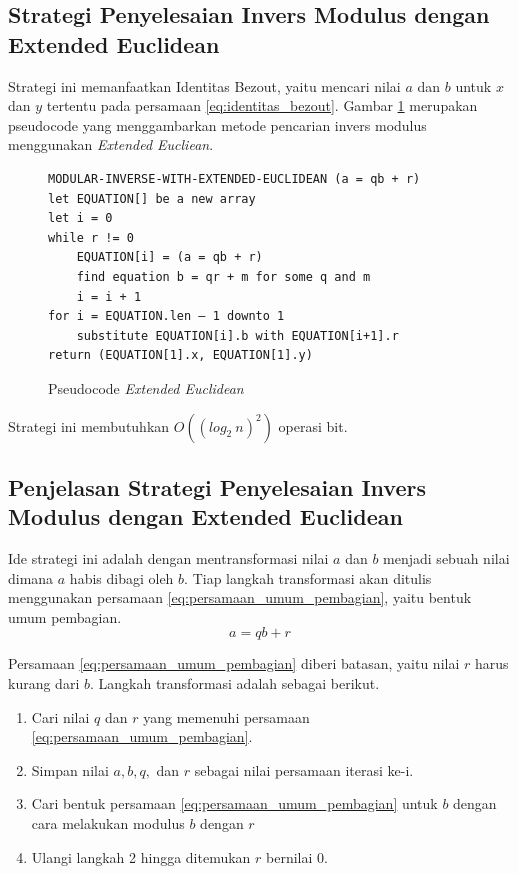 \subsection {Strategi Penyelesaian Invers Modulus dengan Extended Euclidean}

Strategi ini memanfaatkan Identitas Bezout, yaitu mencari nilai $ a $ dan $ b $ untuk $ x $ dan $ y $ tertentu pada persamaan \eqref{eq:identitas_bezout}. Gambar \ref{psdo:extended_euclidean} merupakan pseudocode yang menggambarkan metode pencarian invers modulus menggunakan \textit{Extended Eucliean}.

\begin{figure}[h!]
\begin{lstlisting}[firstnumber=0]
MODULAR-INVERSE-WITH-EXTENDED-EUCLIDEAN (a = qb + r)
let EQUATION[] be a new array
let i = 0
while r != 0
	EQUATION[i] = (a = qb + r)
	find equation b = qr + m for some q and m
	i = i + 1
for i = EQUATION.len – 1 downto 1
	substitute EQUATION[i].b with EQUATION[i+1].r
return (EQUATION[1].x, EQUATION[1].y)
\end{lstlisting}
\caption{Pseudocode \textit{Extended Euclidean}}
\label{psdo:extended_euclidean}
\end{figure}

Strategi ini membutuhkan $ O((log_2\ n)^2) $ operasi bit. \cite{hac_math}

\subsection{Penjelasan Strategi Penyelesaian Invers Modulus dengan Extended Euclidean}

Ide strategi ini adalah dengan mentransformasi nilai $ a $ dan $ b $ menjadi sebuah nilai dimana $ a $ habis dibagi oleh $ b $. Tiap langkah transformasi akan ditulis menggunakan persamaan \eqref{eq:persamaan_umum_pembagian}, yaitu bentuk umum pembagian.
\begin{equation*}
a=qb+r
\end{equation*}

Persamaan \eqref{eq:persamaan_umum_pembagian} diberi batasan, yaitu nilai $ r $ harus kurang dari $ b $. Langkah transformasi adalah sebagai berikut.
\begin{enumerate}
\item Cari nilai $ q $ dan $ r $ yang memenuhi persamaan \eqref{eq:persamaan_umum_pembagian}.
\item Simpan nilai $ a, b, q, $ dan $ r $ sebagai nilai persamaan iterasi ke-i.
\item Cari bentuk persamaan \eqref{eq:persamaan_umum_pembagian} untuk $ b $ dengan cara melakukan modulus $ b $ dengan $ r $
\item Ulangi langkah 2 hingga ditemukan $ r $ bernilai 0.
\end{enumerate}

